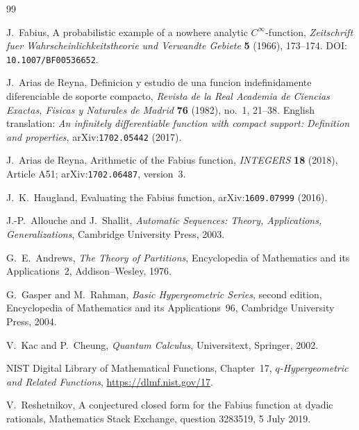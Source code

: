 \documentclass[11pt,oneside]{article}
\theoremstyle{definition}
\theoremstyle{remark}
\begin{document}
\renewcommand{\refname}{Dossier references}
\begin{thebibliography}{99}

J.~Fabius,
\newblock A probabilistic example of a nowhere analytic $C^\infty$-function,
\newblock \emph{Zeitschrift fuer Wahrscheinlichkeitstheorie und Verwandte Gebiete}
  \textbf{5} (1966), 173--174.
\newblock DOI: \nolinkurl{10.1007/BF00536652}.

J.~Arias de Reyna,
\newblock Definicion y estudio de una funcion indefinidamente diferenciable de soporte
  compacto,
\newblock \emph{Revista de la Real Academia de Ciencias Exactas, Fisicas y Naturales de
  Madrid} \textbf{76} (1982), no.~1, 21--38.
\newblock English translation: \emph{An infinitely differentiable function with compact
  support: Definition and properties}, arXiv:\nolinkurl{1702.05442} (2017).

J.~Arias de Reyna,
\newblock Arithmetic of the Fabius function,
\newblock \emph{INTEGERS} \textbf{18} (2018), Article A51;
  arXiv:\nolinkurl{1702.06487}, version~3.

J.~K.~Haugland,
\newblock Evaluating the Fabius function,
\newblock arXiv:\nolinkurl{1609.07999} (2016).

J.-P.~Allouche and J.~Shallit,
\newblock \emph{Automatic Sequences: Theory, Applications, Generalizations},
\newblock Cambridge University Press, 2003.

G.~E.~Andrews,
\newblock \emph{The Theory of Partitions},
\newblock Encyclopedia of Mathematics and its Applications~2,
  Addison--Wesley, 1976.

G.~Gasper and M.~Rahman,
\newblock \emph{Basic Hypergeometric Series}, second edition,
\newblock Encyclopedia of Mathematics and its Applications~96,
  Cambridge University Press, 2004.

V.~Kac and P.~Cheung,
\newblock \emph{Quantum Calculus},
\newblock Universitext, Springer, 2002.

NIST Digital Library of Mathematical Functions, Chapter~17,
\newblock \emph{$q$-Hypergeometric and Related Functions},
\newblock \url{https://dlmf.nist.gov/17}.

V.~Reshetnikov,
\newblock A conjectured closed form for the Fabius function at dyadic rationals,
\newblock Mathematics Stack Exchange, question 3283519, 5 July 2019.


\end{thebibliography}
\end{document}
